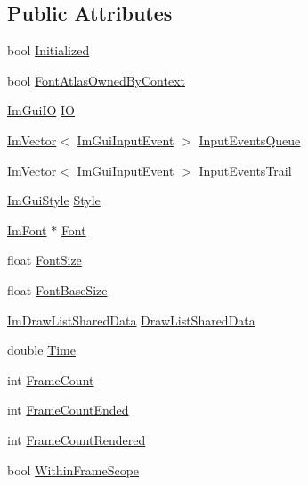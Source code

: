\subsection*{Public Attributes}
\begin{DoxyCompactItemize}
\item 
bool \hyperlink{structImGuiContext_a71b32432f5c4658b4772b293640a66c0}{Initialized}
\item 
bool \hyperlink{structImGuiContext_a06996a09451ec85ef2a34c4de4280441}{Font\+Atlas\+Owned\+By\+Context}
\item 
\hyperlink{structImGuiIO}{Im\+Gui\+IO} \hyperlink{structImGuiContext_add4fdcc8c6a437d8f8e7c837418be83c}{IO}
\item 
\hyperlink{structImVector}{Im\+Vector}$<$ \hyperlink{structImGuiInputEvent}{Im\+Gui\+Input\+Event} $>$ \hyperlink{structImGuiContext_ae6d16d6a5d17963c289c2403f8857399}{Input\+Events\+Queue}
\item 
\hyperlink{structImVector}{Im\+Vector}$<$ \hyperlink{structImGuiInputEvent}{Im\+Gui\+Input\+Event} $>$ \hyperlink{structImGuiContext_aea1526d4c9879d8a70f1f11ea84d4339}{Input\+Events\+Trail}
\item 
\hyperlink{structImGuiStyle}{Im\+Gui\+Style} \hyperlink{structImGuiContext_a2e682502e1a3d2c399171dd3c4fc969d}{Style}
\item 
\hyperlink{structImFont}{Im\+Font} $\ast$ \hyperlink{structImGuiContext_aec64e774018a7d74515baeb9e06fb4e3}{Font}
\item 
float \hyperlink{structImGuiContext_af4022d1866887cdc400131fc6a65b200}{Font\+Size}
\item 
float \hyperlink{structImGuiContext_a0fcbda57d25b80111283ed7305ee3ee8}{Font\+Base\+Size}
\item 
\hyperlink{structImDrawListSharedData}{Im\+Draw\+List\+Shared\+Data} \hyperlink{structImGuiContext_a71045e6879ff2d074836273ba00674e6}{Draw\+List\+Shared\+Data}
\item 
double \hyperlink{structImGuiContext_a2b4eb26da74e5b80bdc7efa34d267570}{Time}
\item 
int \hyperlink{structImGuiContext_ab9a1f3b3f15f0a6c5f29aef85f1a8ea2}{Frame\+Count}
\item 
int \hyperlink{structImGuiContext_aa4cc3099c789be981d665c617b6d78a9}{Frame\+Count\+Ended}
\item 
int \hyperlink{structImGuiContext_a64a96ecd43f4b10c1fec8eb3fc9bff89}{Frame\+Count\+Rendered}
\item 
bool \hyperlink{structImGuiContext_a76ea955f2691b0c034e78127e6788c44}{Within\+Frame\+Scope}

\end{DoxyCompactItemize}
